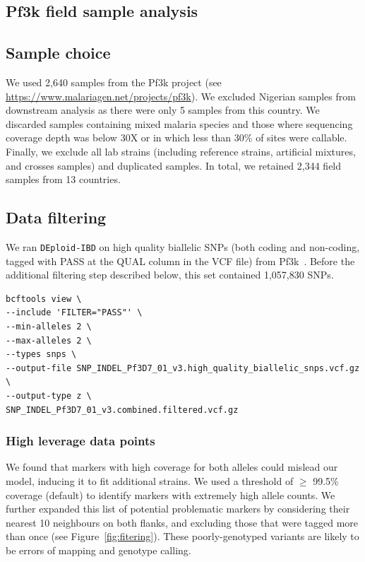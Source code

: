 \documentclass[9pt,lineno]{elife}
\begin{document}
\begin{appendixbox}
\section{Pf3k field sample analysis}
\subsection{Sample choice}
We used 2,640 samples from the Pf3k project (see \url{https://www.malariagen.net/projects/pf3k}). We excluded Nigerian samples from downstream analysis as there were only 5 samples from this country.  We discarded samples containing mixed malaria species and those where sequencing coverage depth was below 30X or in which less than 30\% of sites were callable. Finally, we exclude all lab strains (including reference strains, artificial mixtures, and crosses samples) and duplicated samples. In total, we retained 2,344 field samples from 13 countries.

\subsection{Data filtering}
We ran {\tt DEploid-IBD} on high quality biallelic SNPs (both coding and non-coding, tagged with PASS at the QUAL column in the VCF file) from Pf3k~\citep{pf3k}. Before the additional filtering step described below, this set contained 1,057,830 SNPs.
\linespread{1}
\begin{lstlisting}
bcftools view \
--include 'FILTER="PASS"' \
--min-alleles 2 \
--max-alleles 2 \
--types snps \
--output-file SNP_INDEL_Pf3D7_01_v3.high_quality_biallelic_snps.vcf.gz \
--output-type z \
SNP_INDEL_Pf3D7_01_v3.combined.filtered.vcf.gz
\end{lstlisting}

\subsubsection{High leverage data points}

We found that markers with high coverage for both alleles could mislead our model, inducing it to fit additional strains. We used a threshold of $\geq$ 99.5\% coverage (default) to identify markers with extremely high allele counts. We further expanded this list of potential problematic markers by considering their nearest 10 neighbours on both flanks, and excluding those that were tagged more than once (see Figure~\ref{fig:fitering}). These poorly-genotyped variants are likely to be errors of mapping and genotype calling.


\end{appendixbox}
\end{document}

